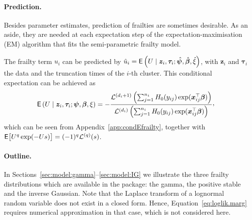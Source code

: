 \paragraph{Prediction.}
Besides parameter estimates, prediction of frailties are sometimes desirable.
  As an aside, they are needed at each expectation step of the expectation-maximisation (EM) algorithm that fits
  the semi-parametric frailty model.

The frailty term $u_i$ can be predicted by
  $\hat u_i = \mathsf{E}\left( U \mid \bm z_i, \bm \tau_i ; \hat{\bm\psi}, \hat{\bm\beta}, \hat\xi \right)$, 
  with $\bm z_i$ and $\bm \tau_i$ the data and the truncation times of the $i$-th cluster.
This conditional expectation can be achieved as 
  \begin{equation*}
    \E\left( U \mid \bm z_i, \bm \tau_i ; \bm\psi, \bm\beta, \xi \right) =
    - \frac{
      \mathcal L^{(d_i + 1)} \left(
          \sum_{j=1}^{n_i}  H_0(y_{ij})
            \exp(\bm x_{ij}^\top \bm\beta)
        \right)
    }{
      \mathcal L^{(d_i)} \left(
          \sum_{j=1}^{n_i} H_0(y_{ij})
            \exp(\bm x_{ij}^\top \bm\beta)
        \right)
    }\ccom
  \end{equation*}
  which can be seen from Appendix~\ref{app:condEfrailty}, together with 
  $\mathsf{E}\big[ U^q \exp(-Us) \big] = (-1)^q \mathcal L^{(q)}(s)$.


\paragraph{Outline.}
In Sections~\ref{sec:model:gamma}--\ref{sec:model:IG} we illustrate the three frailty distributions
  which are available in the  package: 
  the gamma, the positive stable and the inverse Gaussian.
Note that the Laplace transform of a lognormal random variable does not exist in a closed form.
Hence, Equation~\ref{eq:loglik.marg} requires numerical approximation in that case, which is not considered here.
  